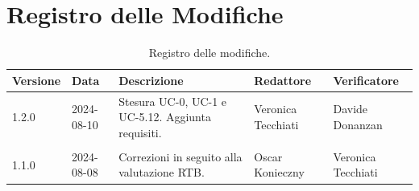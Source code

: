 \documentclass[8pt]{article}
\begin{document}
\section*{Registro delle Modifiche}
\begin{table}[ht!]	
	\centering
	\begin{tabular}{p{1.2cm} p{2cm} p{5cm} p{3cm} p{3cm}}
		\toprule
		\textbf{Versione}& \textbf{Data} & \textbf{Descrizione} & \textbf{Redattore} & \textbf{Verificatore} \\
		\midrule
                1.2.0 & 2024-08-10 & Stesura UC-0, UC-1 e UC-5.12. Aggiunta requisiti. & Veronica Tecchiati & Davide Donanzan \\\\
			1.1.0 & 2024-08-08 & Correzioni in seguito alla valutazione RTB. & Oscar Konieczny & Veronica Tecchiati
 		    \\ %
		\bottomrule
	\end{tabular}
	\caption{Registro delle modifiche.}
	\label{table:Registro delle modifiche}
\end{table}
\clearpage
\end{document}
